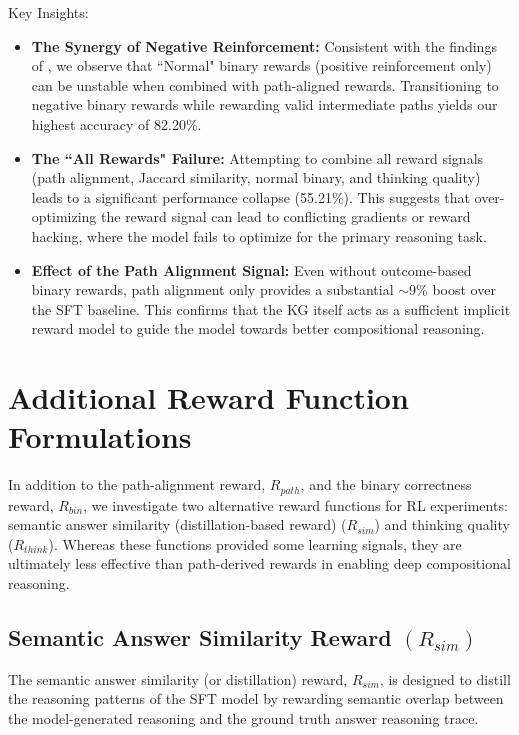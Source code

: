 \documentclass{article}
\theoremstyle{plain}
\theoremstyle{definition}
\theoremstyle{remark}
\begin{document}
Key Insights:
\begin{itemize}
    \item \textbf{The Synergy of Negative Reinforcement:} Consistent with the findings of \cite{Zhu2025}, we observe that ``Normal" binary rewards (positive reinforcement only) can be unstable when combined with path-aligned rewards. Transitioning to negative binary rewards while rewarding valid intermediate paths yields our highest accuracy of 82.20\%.

    \item \textbf{The ``All Rewards" Failure:} Attempting to combine all reward signals (path alignment, Jaccard similarity, normal binary, and thinking quality) leads to a significant performance collapse (55.21\%). This suggests that over-optimizing the reward signal can lead to conflicting gradients or reward hacking, where the model fails to optimize for the primary reasoning task.

    \item \textbf{Effect of the Path Alignment Signal:} Even without outcome-based binary rewards, path alignment only provides a substantial $\sim$9\% boost over the SFT baseline. This confirms that the KG itself acts as a sufficient implicit reward model to guide the model towards better compositional reasoning.
    
\end{itemize}


\newpage
\section{Additional Reward Function Formulations}
\label{Appendix C}
In addition to the path-alignment reward, $R_{path}$, and the binary correctness reward, $R_{bin}$, we investigate two alternative reward functions for RL experiments: semantic answer similarity (distillation-based reward) ($R_{sim}$) and thinking quality ($R_{think}$). Whereas these functions provided some learning signals, they are ultimately less effective than path-derived rewards in enabling deep compositional reasoning.

\subsection{Semantic Answer Similarity Reward $(R_{sim})$}
The semantic answer similarity (or distillation) reward, $R_{sim}$, is designed to distill the reasoning patterns of the SFT model by rewarding semantic overlap between the model-generated reasoning and the ground truth answer reasoning trace.
\end{document}
